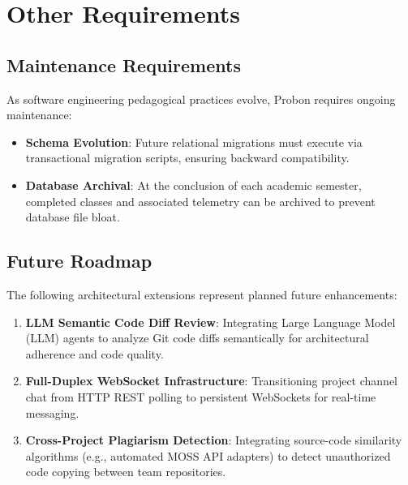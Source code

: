 \documentclass{scrreprt}
\begin{document}
\chapter{Other Requirements}\label{chap:other_requirements}

\section{Maintenance Requirements}\label{sec:maintenance}
As software engineering pedagogical practices evolve, Probon requires ongoing maintenance:
\begin{itemize}
    \item \textbf{Schema Evolution}: Future relational migrations must execute via transactional migration scripts, ensuring backward compatibility.
    \item \textbf{Database Archival}: At the conclusion of each academic semester, completed classes and associated telemetry can be archived to prevent database file bloat.
\end{itemize}

\section{Future Roadmap}\label{sec:future_roadmap}
The following architectural extensions represent planned future enhancements:
\begin{enumerate}
    \item \textbf{LLM Semantic Code Diff Review}: Integrating Large Language Model (LLM) agents to analyze Git code diffs semantically for architectural adherence and code quality.
    \item \textbf{Full-Duplex WebSocket Infrastructure}: Transitioning project channel chat from HTTP REST polling to persistent WebSockets for real-time messaging.
    \item \textbf{Cross-Project Plagiarism Detection}: Integrating source-code similarity algorithms (e.g., automated MOSS API adapters) to detect unauthorized code copying between team repositories.
\end{enumerate}
\end{document}
